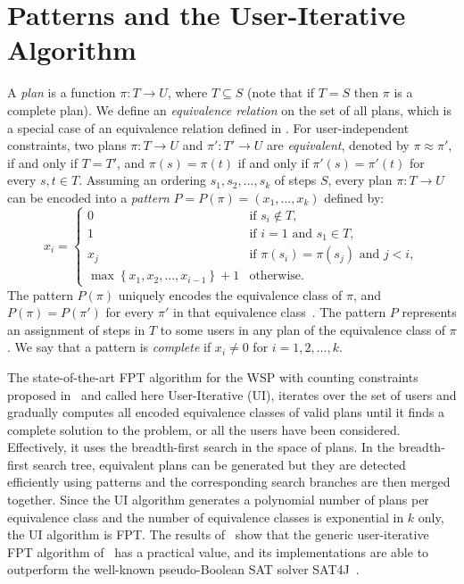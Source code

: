 \documentclass[runningheads,proof]{llncs}
\newcommand{\set}[1]{\left\{#1\right\}}
\begin{document}
\section{Patterns and the User-Iterative Algorithm}
\label{sec:patterns-and-ui}




A \emph{plan} is a function $\pi: T \rightarrow U$, where $T \subseteq S$ (note that if $T = S$ then $\pi$ is a complete plan).  We define an \emph{equivalence relation} on the set of all plans, which is a special case of an equivalence relation defined in \cite{CoCrGaGuJo13}.
For user-independent constraints, two plans $\pi : T \rightarrow U$ and $\pi' : T' \rightarrow U$ are \emph{equivalent}, denoted by $\pi \approx \pi'$, if and only if $T = T'$, and $\pi(s) = \pi(t)$ if and only if $\pi'(s) = \pi'(t)$ for every $s, t \in T$.
Assuming an ordering $s_1, s_2, \dots, s_k$ of steps $S$,
every plan $\pi : T \rightarrow U$ can be encoded into a \emph{pattern} $P = P(\pi) = (x_1,\dots,x_k)$ defined by:
\begin{equation}
 x_i =
  \begin{cases}
    0 & \text{if } s_i \notin T, \\
    1 & \text{if } i = 1 \text{ and } s_1 \in T,\\
    x_j & \text{if } \pi(s_i) = \pi(s_j) \text{ and } j < i, \\
    \max\set{x_1, x_2, \dots, x_{i-1}} + 1 & \text{otherwise.}
  \end{cases}
\end{equation}
The pattern $P(\pi)$ uniquely encodes the equivalence class of $\pi$, and $P(\pi) = P(\pi')$ for every $\pi'$ in that equivalence class~\cite{CoCrGaGuJo13}. The pattern $P$ represents an assignment of steps in $T$ to some users in any plan of the equivalence class of $\pi$.  
We say that a pattern is \emph{complete} if $x_i \neq 0$ for $i = 1, 2, \ldots, k$.

The state-of-the-art FPT algorithm for the WSP with counting constraints proposed in~\cite{FAW2014} and called here User-Iterative (UI), iterates over the set of users and gradually computes all encoded equivalence classes of valid plans until it finds a complete solution to the problem, or all the users have been considered. 
Effectively, it uses the breadth-first search in the space of plans.  
In the breadth-first search tree, equivalent plans can be generated but they are detected efficiently using patterns and the corresponding search branches are then merged together.  
Since the UI algorithm generates a polynomial number of plans per equivalence class and the number of equivalence classes is exponential in $k$ only, the UI algorithm is FPT.
The results of~\cite{FAW2014,JOCO2014} show that the generic user-iterative FPT algorithm of~\cite{CoCrGaGuJo13} has a practical value, and its implementations are able to outperform the well-known pseudo-Boolean SAT solver SAT4J~\cite{BePa10}.
\end{document}

